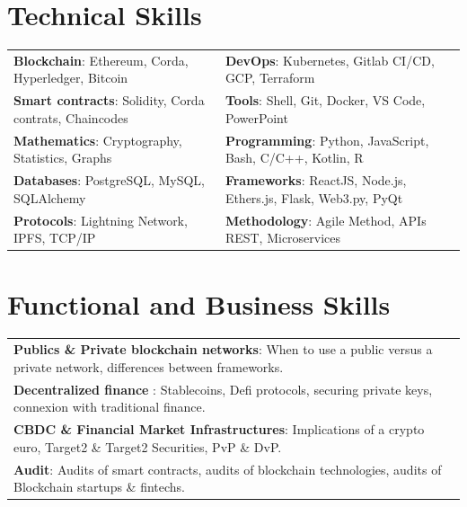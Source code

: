 \documentclass[10pt]{article}
\begin{document}
\vspace{2ex}

\section*{Technical Skills}

\vspace{2ex}

\begin{tabular}{ l l }
\textbf{Blockchain}: Ethereum, Corda, Hyperledger, Bitcoin & \textbf{DevOps}: Kubernetes, Gitlab CI/CD, GCP, Terraform \\[0.1cm]
\textbf{Smart contracts}: Solidity, Corda contrats, Chaincodes & \textbf{Tools}: Shell, Git, Docker, VS Code, PowerPoint \\[0.1cm]
\textbf{Mathematics}: Cryptography, Statistics, Graphs & \textbf{Programming}: Python, JavaScript, Bash, C/C++, Kotlin, R \\[0.1cm]
\textbf{Databases}: PostgreSQL, MySQL, SQLAlchemy & \textbf{Frameworks}: ReactJS, Node.js, Ethers.js, Flask, Web3.py, PyQt \\[0.1cm]
\textbf{Protocols}: Lightning Network, IPFS, TCP/IP & \textbf{Methodology}: Agile Method, APIs REST, Microservices \\[0.1cm]
\end{tabular}

\vspace{2ex}

\section*{Functional and Business Skills}

\vspace{2ex}

\begin{tabular}{ l }
\textbf{Publics \& Private blockchain networks}: When to use a public versus a private network, differences between frameworks.\\[0.1cm]
\textbf{Decentralized finance} : Stablecoins, Defi protocols, securing private keys, connexion with traditional finance.\\[0.1cm]
\textbf{CBDC \& Financial Market Infrastructures}: Implications of a crypto euro, Target2 \& Target2 Securities, PvP \& DvP.\\[0.1cm]
\textbf{Audit}: Audits of smart contracts, audits of blockchain technologies, audits of Blockchain startups \& fintechs.\\[0.1cm]
\end{tabular}
\end{document}
